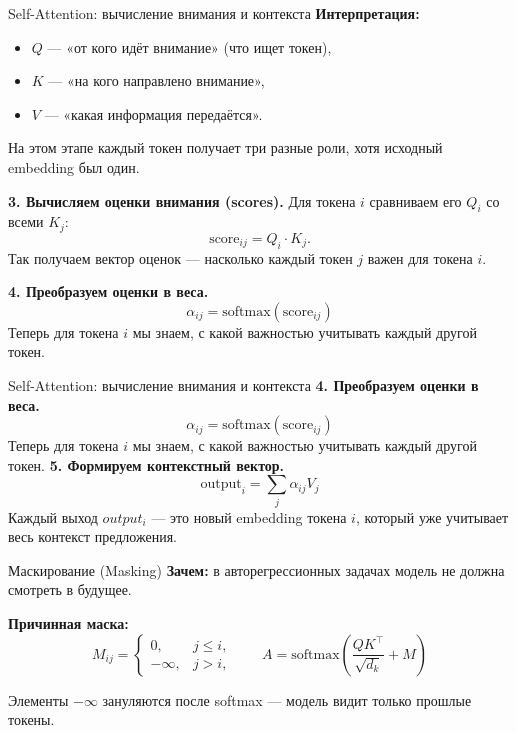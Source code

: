 \documentclass[aspectratio=1610,12pt]{beamer}
\begin{document}
\begin{frame}{Self-Attention: вычисление внимания и контекста}
\small
\textbf{Интерпретация:}
\begin{itemize}
  \item $Q$ — «от кого идёт внимание» (что ищет токен),
  \item $K$ — «на кого направлено внимание»,
  \item $V$ — «какая информация передаётся».
\end{itemize}
На этом этапе каждый токен получает три разные роли, хотя исходный embedding был один.




\textbf{3. Вычисляем оценки внимания (scores).}
Для токена $i$ сравниваем его $Q_i$ со всеми $K_j$:
\[
\text{score}_{ij} = Q_i \cdot K_j.
\]
Так получаем вектор оценок — насколько каждый токен $j$ важен для токена $i$.

\vspace{0.4em}
\textbf{4. Преобразуем оценки в веса.}
\[
\alpha_{ij} = \mathrm{softmax}(\text{score}_{ij})
\]
Теперь для токена $i$ мы знаем, с какой важностью учитывать каждый другой токен.
\end{frame}
\begin{frame}{Self-Attention: вычисление внимания и контекста}
\small
\vspace{0.4em}
\textbf{4. Преобразуем оценки в веса.}
\[
\alpha_{ij} = \mathrm{softmax}(\text{score}_{ij})
\]
Теперь для токена $i$ мы знаем, с какой важностью учитывать каждый другой токен.
\vspace{0.4em}
\textbf{5. Формируем контекстный вектор.}
\[
\text{output}_i = \sum_j \alpha_{ij} V_j
\]
Каждый выход $output_i$ — это новый embedding токена $i$, который уже учитывает весь контекст предложения.

\end{frame}

\begin{frame}{Маскирование (Masking)}
\small
\textbf{Зачем:}
в авторегрессионных задачах модель не должна смотреть в будущее.

\vspace{0.4em}
\textbf{Причинная маска:}
\[
M_{ij} =
\begin{cases}
0, & j \le i,\\
-\infty, & j > i,
\end{cases}
\qquad
A = \mathrm{softmax}\!\left(\frac{QK^\top}{\sqrt{d_k}} + M\right)
\]

\vspace{0.4em}
Элементы $-\infty$ зануляются после softmax —
модель видит только прошлые токены.
\end{frame}
\end{document}
